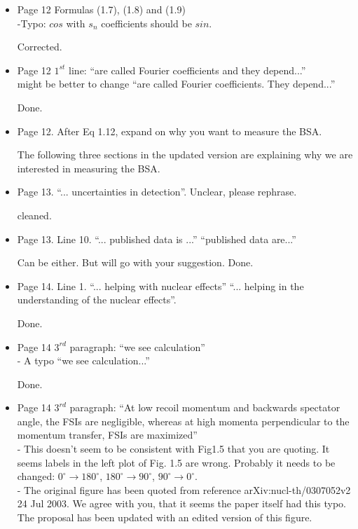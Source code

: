\begin{itemize}
  
  \item Page 12 Formulas (1.7), (1.8) and (1.9) \\
  -Typo: $cos$ with $s_{n}$ coefficients should be $sin$.
  
     {\color{red} Corrected.}
  
  \item Page 12 $1^{st}$ line:  ``are called Fourier coefficients and they 
     depend...'' \\
  might be better to change ``are called Fourier coefficients. They depend...''
     
       {\color{red} Done.}
  
  \item Page 12. After Eq 1.12, expand on why you want to measure the BSA.
       
     {\color{red} The following three sections in the updated version are 
       explaining why we are interested in measuring the BSA.}
  
  \item Page 13. ``... uncertainties in detection''. Unclear, please rephrase.
     
     {\color{red} cleaned.}
  
  \item Page 13. Line 10. ``... published data is ...'' \rarr ``published data are...''
     
     {\color{red} Can be either. But will go with your suggestion. Done.}
  
  \item Page 14. Line 1. ``... helping with nuclear effects'' \rarr ``...  
     helping in the understanding of the nuclear effects''.
     
       {\color{red} Done.}
  
  \item Page 14 $3^{rd}$ paragraph: ``we see calculation''\\
  - A typo ``we see calculation...''
     
     {\color{red} Done.}
  
  \item Page 14 $3^{rd}$ paragraph: ``At low recoil momentum and
backwards spectator angle, the FSIs are negligible, whereas at high momenta perpendicular
to the momentum transfer, FSIs are maximized'' \\ 
- This doesn't seem to be consistent with Fig1.5 that you are quoting. It seems 
  labels in the left plot of Fig. 1.5 are wrong. Probably it needs to be 
  changed: $0^{\circ}\rightarrow 180^{\circ}$, $180^{\circ}\rightarrow 
  90^{\circ}$, $90^{\circ}\rightarrow 0^{\circ}$.\\
     {\color{red} 
     - The original figure has been quoted from reference 
       arXiv:nucl-th/0307052v2  24 Jul 2003. We agree with you, that it seems 
       the paper itself had this typo. The proposal has been updated with an 
       edited version of this figure. \\
     }




\end{itemize}
